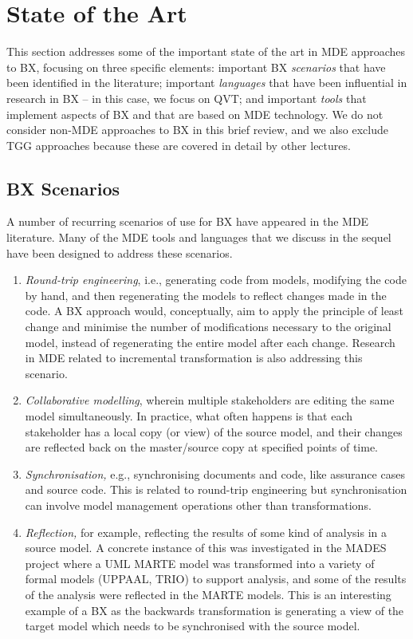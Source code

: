 \section{State of the Art}
\label{section:state-of-the-art}

This section addresses some of the important state of the art in MDE approaches to BX, focusing on three specific elements: important BX \textit{scenarios} that have been identified in the literature; important \textit{languages} that have been influential in research in BX -- in this case, we focus on QVT; and important \textit{tools} that implement aspects of BX and that are based on MDE technology. We do not consider non-MDE approaches to BX in this brief review, and we also exclude TGG approaches because these are covered in detail by other lectures.

\subsection{BX Scenarios}
A number of recurring scenarios of use for BX have appeared in the MDE literature. Many of the MDE tools and languages that we discuss in the sequel have been designed to address these scenarios.

\begin{enumerate}
\item \textit{Round-trip engineering}, i.e., generating code from models, modifying the code by hand, and then regenerating the models to reflect changes made in the code. A BX approach would, conceptually, aim to apply the principle of least change and minimise the number of modifications necessary to the original model, instead of regenerating the entire model after each change. Research in MDE related to incremental transformation is also addressing this scenario.

\item \textit{Collaborative modelling}, wherein multiple stakeholders are editing the same model simultaneously. In practice, what often happens is that each stakeholder has a local copy (or view) of the source model, and their changes are reflected back on the master/source copy at specified points of time.

\item \textit{Synchronisation,} e.g., synchronising documents and code, like assurance cases and source code. This is related to round-trip engineering but synchronisation can involve model management operations other than transformations.

\item \textit{Reflection,} for example, reflecting the results of some kind of analysis in a source model. A concrete instance of this was investigated in the MADES project where a UML MARTE model was transformed into a variety of formal models (UPPAAL, TRIO) to support analysis, and some of the results of the analysis were reflected in the MARTE models. This is an interesting example of a BX as the backwards transformation is generating a view of the target model which needs to be synchronised with the source model.
\end{enumerate}

